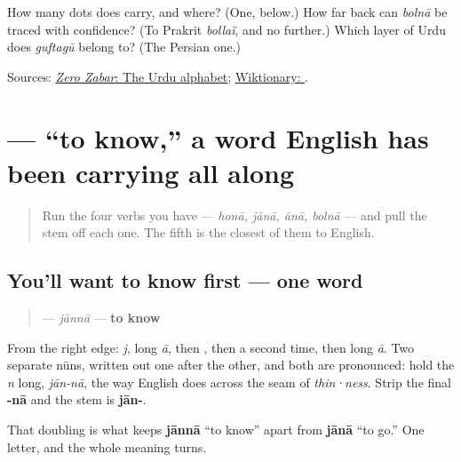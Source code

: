 \begin{tcolorbox}[breakable,colback=teal!4,colframe=teal!35!black,title={Before you move on}]
How many dots does \textbf{} carry, and where? (One, below.) How far back can \emph{bolnā} be traced with confidence? (To Prakrit \emph{bollaï}, and no further.) Which layer of Urdu does \emph{guftagū} belong to? (The Persian one.)

Sources: \href{https://openbooks.library.northwestern.edu/zerozabar/chapter/the-urdu-alphabet/}{\emph{Zero Zabar}: The Urdu alphabet}; \href{https://en.wiktionary.org/wiki/\%D8\%A8\%D9\%88\%D9\%84\%D9\%86\%D8\%A7\#Urdu}{Wiktionary: }.
\end{tcolorbox}
\section[\texorpdfstring{\ur{جاننا} (jānnā)}{جاننا (jānnā)}]{ — “to know,” a word English has been carrying all along}

\label{lesson:UR-C06-janna}



\begin{quote}
Run the four verbs you have — \emph{honā, jānā, ānā, bolnā} — and pull the stem off each one. The fifth is the closest of them to English.
\end{quote}

\subsection*{You'll want to know first — one word}
\begin{quote}
\textbf{} — \emph{jānnā} — \textbf{to know}
\end{quote}

From the right edge: \textbf{} \emph{j}, \textbf{} long \emph{ā}, then \textbf{}, then \textbf{} a second time, then \textbf{} long \emph{ā}. Two separate nūns, written out one after the other, and both are pronounced: hold the \emph{n} long, \emph{jān-nā}, the way English does across the seam of \emph{thin·ness}. Strip the final \textbf{-nā} and the stem is \textbf{jān-}.

That doubling is what keeps \textbf{jānnā} “to know” apart from \textbf{jānā} “to go.” One letter, and the whole meaning turns.


